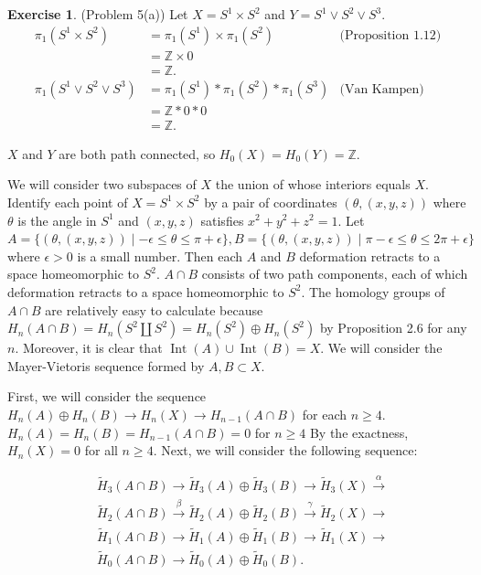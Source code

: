 \documentclass[12pt, psamsfonts]{amsart}
\theoremstyle{definition}
\newtheorem*{exer}{Exercise}
\theoremstyle{remark}
\DeclareMathOperator{\Int}{Int}
\numberwithin{equation}{section}
\begin{document}
\begin{exer}{(Problem 5(a))}
  Let $X = S^1 \times S^2$ and $Y = S^1 \vee S^2 \vee S^3$.
  \begin{align*}
    \pi_1(S^1 \times S^2)
      &= \pi_1(S^1) \times \pi_1(S^2) & \text{(Proposition 1.12)} \\
      &= \mathbb{Z} \times 0 \\
      &= \mathbb{Z}. \\
    \pi_1(S^1 \vee S^2 \vee S^3)
      &= \pi_1(S^1) * \pi_1(S^2) * \pi_1(S^3) & \text{(Van Kampen)} \\
      &= \mathbb{Z} * 0 * 0 \\
      &= \mathbb{Z}.
  \end{align*}

  $X$ and $Y$ are both path connected, so $H_0(X) = H_0(Y) = \mathbb{Z}$.

  We will consider two subspaces of $X$ the union of whose interiors equals $X$.
  Identify each point of $X = S^1 \times S^2$ by a pair of coordinates $(\theta, (x, y, z))$ where $\theta$ is the angle in $S^1$ and $(x, y, z)$ satisfies $x^2 + y^2 + z^2 = 1$.
  Let $A = \{ (\theta, (x, y, z)) \mid -\epsilon \leq \theta \leq \pi + \epsilon \}, B = \{ (\theta, (x, y, z)) \mid \pi - \epsilon \leq \theta \leq 2\pi + \epsilon \}$ where $\epsilon > 0$ is a small number.
  Then each $A$ and $B$ deformation retracts to a space homeomorphic to $S^2$.
  $A \cap B$ consists of two path components, each of which deformation retracts to a space homeomorphic to $S^2$.
  The homology groups of $A \cap B$ are relatively easy to calculate because $H_n(A \cap B) = H_n(S^2 \coprod S^2) = H_n(S^2) \oplus H_n(S^2)$ by Proposition 2.6 for any $n$.
  Moreover, it is clear that $\Int(A) \cup \Int(B) = X$.
  We will consider the Mayer-Vietoris sequence formed by $A, B \subset X$.

  First, we will consider the sequence $H_n(A) \oplus H_n(B) \rightarrow H_n(X) \rightarrow H_{n - 1}(A \cap B)$ for each $n \geq 4$.
  $H_n(A) = H_n(B) = H_{n - 1}(A \cap B) = 0$ for $n \geq 4$
  By the exactness, $H_n(X) = 0$ for all $n \geq 4$.
  Next, we will consider the following sequence:

  \begin{align*}
    &\tilde{H}_3(A \cap B) \rightarrow \tilde{H}_3(A) \oplus \tilde{H}_3(B) \rightarrow \tilde{H}_3(X) \xrightarrow{\alpha} \\
    &\tilde{H}_2(A \cap B) \xrightarrow{\beta} \tilde{H}_2(A) \oplus \tilde{H}_2(B) \xrightarrow{\gamma} \tilde{H}_2(X) \rightarrow \\
    &\tilde{H}_1(A \cap B) \rightarrow \tilde{H}_1(A) \oplus \tilde{H}_1(B) \rightarrow \tilde{H}_1(X) \rightarrow \\
    &\tilde{H}_0(A \cap B) \rightarrow \tilde{H}_0(A) \oplus \tilde{H}_0(B).
  \end{align*}


\end{exer}
\end{document}
